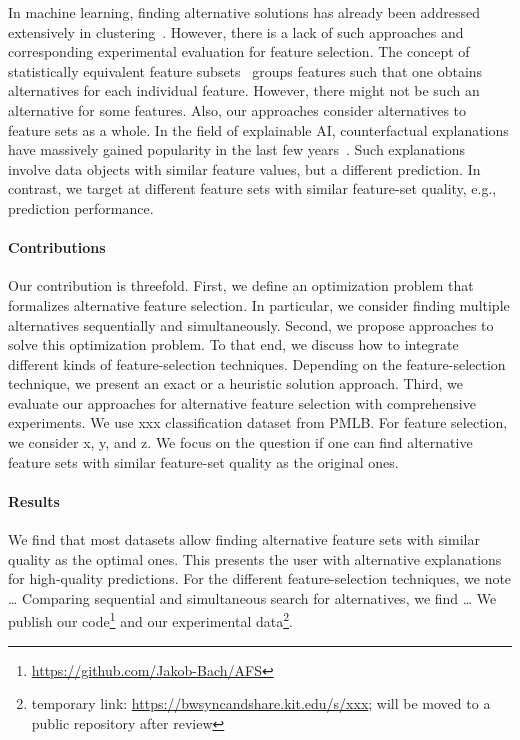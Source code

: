 \documentclass{article}
\theoremstyle{definition}
\begin{document}
In machine learning, finding alternative solutions has already been addressed extensively in clustering~\cite{bae2006coala}.
However, there is a lack of such approaches and corresponding experimental evaluation for feature selection.
The concept of statistically equivalent feature subsets~\cite{lagani2017feature} groups features such that one obtains alternatives for each individual feature.
However, there might not be such an alternative for some features.
Also, our approaches consider alternatives to feature sets as a whole.
In the field of explainable AI, counterfactual explanations have massively gained popularity in the last few years~\cite{verma2020counterfactual, stepin2021survey}.
Such explanations involve data objects with similar feature values, but a different prediction.
In contrast, we target at different feature sets with similar feature-set quality, e.g., prediction performance.

\paragraph{Contributions}

Our contribution is threefold.
First, we define an optimization problem that formalizes alternative feature selection.
In particular, we consider finding multiple alternatives sequentially and simultaneously.
Second, we propose approaches to solve this optimization problem.
To that end, we discuss how to integrate different kinds of feature-selection techniques.
Depending on the feature-selection technique, we present an exact or a heuristic solution approach.
Third, we evaluate our approaches for alternative feature selection with comprehensive experiments.
We use xxx classification dataset from PMLB\cite{olson2017pmlb, romano2021pmlb}.
For feature selection, we consider x, y, and z.
We focus on the question if one can find alternative feature sets with similar feature-set quality as the original ones.

\paragraph{Results}

We find that most datasets allow finding alternative feature sets with similar quality as the optimal ones.
This presents the user with alternative explanations for high-quality predictions.
For the different feature-selection techniques, we note \dots
Comparing sequential and simultaneous search for alternatives, we find \dots
We publish our code\footnote{\url{https://github.com/Jakob-Bach/AFS}} and our experimental data\footnote{temporary link: \url{https://bwsyncandshare.kit.edu/s/xxx}; will be moved to a public repository after review}.
\end{document}
